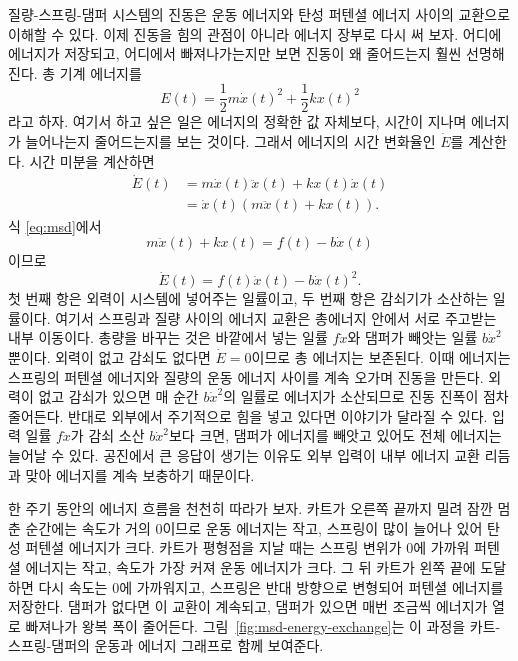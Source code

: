 질량-스프링-댐퍼 시스템의 진동은 운동 에너지와 탄성 퍼텐셜 에너지 사이의 교환으로 이해할 수 있다.
이제 진동을 힘의 관점이 아니라 에너지 장부로 다시 써 보자.
어디에 에너지가 저장되고, 어디에서 빠져나가는지만 보면 진동이 왜 줄어드는지 훨씬 선명해진다.
총 기계 에너지를
\begin{equation}
  E(t)
  =
  \frac{1}{2}m\dot{x}(t)^2
  +
  \frac{1}{2}kx(t)^2
\end{equation}
라고 하자.
여기서 하고 싶은 일은 에너지의 정확한 값 자체보다, 시간이 지나며 에너지가 늘어나는지 줄어드는지를 보는 것이다.
그래서 에너지의 시간 변화율인 $\dot{E}$를 계산한다.
시간 미분을 계산하면
\begin{align}
  \dot{E}(t)
  &=
  m\dot{x}(t)\ddot{x}(t)
  +
  kx(t)\dot{x}(t) \\
  &=
  \dot{x}(t)\left(m\ddot{x}(t)+kx(t)\right).
\end{align}
식 \eqref{eq:msd}에서
\begin{equation}
  m\ddot{x}(t)+kx(t)=f(t)-b\dot{x}(t)
\end{equation}
이므로
\begin{equation}
  \dot{E}(t)
  =
  f(t)\dot{x}(t)
  -
  b\dot{x}(t)^2.
\end{equation}
첫 번째 항은 외력이 시스템에 넣어주는 일률이고, 두 번째 항은 감쇠기가 소산하는 일률이다.
여기서 스프링과 질량 사이의 에너지 교환은 총에너지 안에서 서로 주고받는 내부 이동이다.
총량을 바꾸는 것은 바깥에서 넣는 일률 $f\dot{x}$와 댐퍼가 빼앗는 일률 $b\dot{x}^2$뿐이다.
외력이 없고 감쇠도 없다면 $\dot{E}=0$이므로 총 에너지는 보존된다.
이때 에너지는 스프링의 퍼텐셜 에너지와 질량의 운동 에너지 사이를 계속 오가며 진동을 만든다.
외력이 없고 감쇠가 있으면 매 순간 $b\dot{x}^2$의 일률로 에너지가 소산되므로 진동 진폭이 점차 줄어든다.
반대로 외부에서 주기적으로 힘을 넣고 있다면 이야기가 달라질 수 있다.
입력 일률 $f\dot{x}$가 감쇠 소산 $b\dot{x}^2$보다 크면, 댐퍼가 에너지를 빼앗고 있어도 전체 에너지는 늘어날 수 있다.
공진에서 큰 응답이 생기는 이유도 외부 입력이 내부 에너지 교환 리듬과 맞아 에너지를 계속 보충하기 때문이다.

한 주기 동안의 에너지 흐름을 천천히 따라가 보자.
카트가 오른쪽 끝까지 밀려 잠깐 멈춘 순간에는 속도가 거의 0이므로 운동 에너지는 작고, 스프링이 많이 늘어나 있어 탄성 퍼텐셜 에너지가 크다.
카트가 평형점을 지날 때는 스프링 변위가 0에 가까워 퍼텐셜 에너지는 작고, 속도가 가장 커져 운동 에너지가 크다.
그 뒤 카트가 왼쪽 끝에 도달하면 다시 속도는 0에 가까워지고, 스프링은 반대 방향으로 변형되어 퍼텐셜 에너지를 저장한다.
댐퍼가 없다면 이 교환이 계속되고, 댐퍼가 있으면 매번 조금씩 에너지가 열로 빠져나가 왕복 폭이 줄어든다.
그림~\ref{fig:msd-energy-exchange}는 이 과정을 카트-스프링-댐퍼의 운동과 에너지 그래프로 함께 보여준다.

